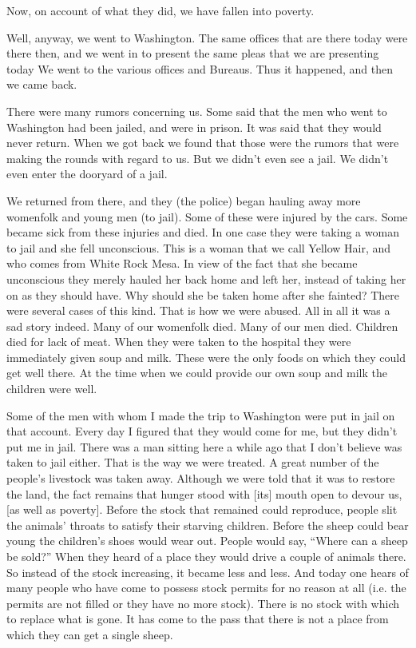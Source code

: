Now, on account of what they did, we have fallen into poverty.

Well, anyway, we went to Washington. The same offices that are there today were there then, and we went in to present the same pleas that we are presenting today We went to the various offices and Bureaus. Thus it happened, and then we came back.

There were many rumors concerning us. Some said that the men who went to Washington had been jailed, and were in prison. It was said that they would never return. When we got back we found that those were the rumors that were making the rounds with regard to us. But we didn't even see a jail. We didn't even enter the dooryard of a jail.

We returned from there, and they (the police) began hauling away more womenfolk and young men (to jail). Some of these were injured by the cars. Some became sick from these injuries and died. In one case they were taking a woman to jail and she fell unconscious. This is a woman that we call Yellow Hair, and who comes from White Rock Mesa. In view of the fact that she became unconscious they merely hauled her back home and left her, instead of taking her on as they should have. Why should she be taken home after she fainted? There were several cases of this kind. That is how we were abused. All in all it was a sad story indeed. Many of our womenfolk died. Many of our men died. Children died for lack of meat. When they were taken to the hospital they were immediately given soup and milk. These were the only foods on which they could get well there. At the time when we could provide our own soup and milk the children were well.

Some of the men with whom I made the trip to Washington were put in jail on that account. Every day I figured that they would come for me, but they didn't put me in jail. There was a man sitting here a while ago that I don't believe was taken to jail either. That is the way we were treated. A great number of the people's livestock was taken away. Although we were told that it was to restore the land, the fact remains that hunger stood with [its] mouth open to devour us, [as well as poverty]. Before the stock that remained could reproduce, people slit the animals' throats to satisfy their starving children. Before the sheep could bear young the children's shoes would wear out. People would say, ``Where can a sheep be sold?'' When they heard of a place they would drive a couple of animals there. So instead of the stock increasing, it became less and less. And today one hears of many people who have come to possess stock permits for no reason at all (i.e. the permits are not filled or they have no more stock). There is no stock with which to replace what is gone. It has come to the pass that there is not a place from which they can get a single sheep.

